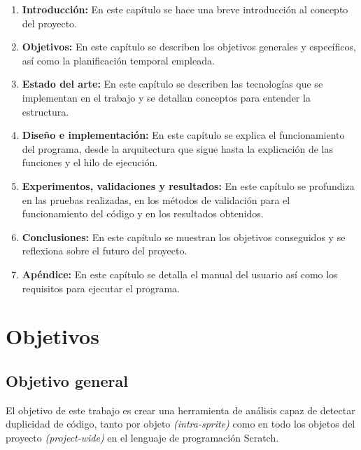 \documentclass[a4paper, 12pt]{book}
\begin{document}
\begin{enumerate}
  	\item \textbf{Introducción:} En este capítulo se hace una breve introducción al concepto del proyecto. 
  	\item \textbf{Objetivos:} En este capítulo se describen los objetivos generales y específicos, así como la planificación temporal empleada.
  	\item \textbf{Estado del arte:} En este capítulo se describen las tecnologías que se implementan en el trabajo y se detallan conceptos para entender la estructura.
  	\item \textbf{Diseño e implementación:} En este capítulo se explica el funcionamiento del programa, desde la arquitectura que sigue hasta la explicación de las funciones y el hilo de ejecución.
  	\item \textbf{Experimentos, validaciones y resultados:} En este capítulo se profundiza en las pruebas realizadas, en los métodos de validación para el funcionamiento del código y en los resultados obtenidos.
  	\item \textbf{Conclusiones:} En este capítulo se muestran los objetivos conseguidos y se reflexiona sobre el futuro del proyecto.
  	\item \textbf{Apéndice:} En este capítulo se detalla el manual del usuario así como los requisitos para ejecutar el programa.  
\end{enumerate}


\cleardoublepage %
\chapter{Objetivos} %
\label{chap:objetivos} %

\section{Objetivo general} %
\label{sec:objetivo-general} %

El objetivo de este trabajo es crear una herramienta de análisis capaz de detectar duplicidad de código, tanto por objeto \textit{(intra-sprite)} como en todo los objetos del proyecto \textit{(project-wide)} en el lenguaje de programación Scratch.
\end{document}

